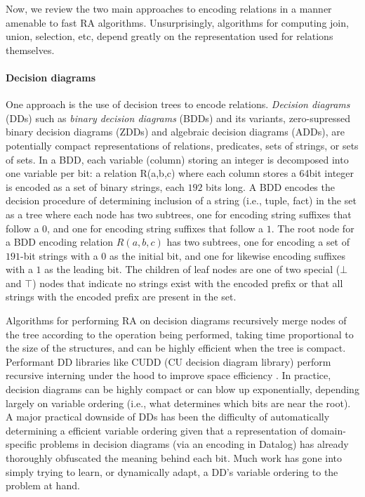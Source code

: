 Now, we review the two main approaches to encoding relations in a manner amenable to fast RA algorithms. Unsurprisingly, algorithms for computing join, union, selection, etc, depend greatly on the representation used for relations themselves. 

\paragraph{Decision diagrams} One approach is the use of decision trees to encode relations. \emph{Decision diagrams} (DDs) such as \emph{binary decision diagrams} (BDDs) and its variants, zero-supressed binary decision diagrams (ZDDs) and algebraic decision diagrams (ADDs), are potentially compact representations of relations, predicates, sets of strings, or sets of sets. In a BDD, each variable (column) storing an integer is decomposed into one variable per bit: a relation R(a,b,c) where each column stores a 64bit integer is encoded as a set of binary strings, each $192$ bits long. A BDD encodes the decision procedure of determining inclusion of a string (i.e., tuple, fact) in the set as a tree where each node has two subtrees, one for encoding string suffixes that follow a $0$, and one for encoding string suffixes that follow a $1$. The root node for a BDD encoding relation $R(a,b,c)$ has two subtrees, one for encoding a set of $191$-bit strings with a $0$ as the initial bit, and one for likewise encoding suffixes with a $1$ as the leading bit. The children of leaf nodes are one of two special ($\bot$ and $\top$) nodes that indicate no strings exist with the encoded prefix or that all strings with the encoded prefix are present in the set. 

Algorithms for performing RA on decision diagrams recursively merge nodes of the tree according to the operation being performed, taking time proportional to the size of the structures, and can be highly efficient when the tree is compact. Performant DD libraries like CUDD (CU decision diagram library) perform recursive interning under the hood to improve space efficiency \cite{}. In practice, decision diagrams can be highly compact or can blow up exponentially, depending largely on variable ordering (i.e., what determines which bits are near the root). A major practical downside of DDs has been the difficulty of automatically determining a efficient variable ordering given that a representation of domain-specific problems in decision diagrams (via an encoding in Datalog) has already thoroughly obfuscated the meaning behind each bit. Much work has gone into simply trying to learn, or dynamically adapt, a DD's variable ordering to the problem at hand. 

